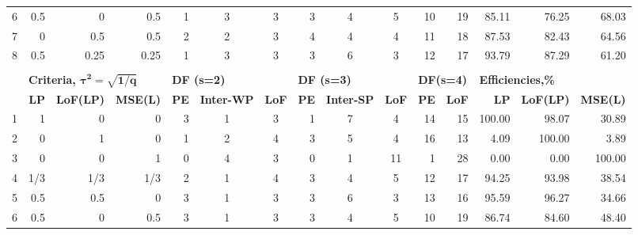 \begin{table}[h]
{\begin{tabular}{rrrrccccccrrrrr}
6 & 0.5  & 0    & 0.5  & \multicolumn{1}{|r}{1} & 3 & 3 & \multicolumn{1}{|r}{3} & 4 & 5  & \multicolumn{1}{|r}{10} & 19 & \multicolumn{1}{|r}{85.11}  & 76.25  & 68.03  \\
7 & 0    & 0.5  & 0.5  & \multicolumn{1}{|r}{2} & 2 & 3 & \multicolumn{1}{|r}{4} & 4 & 4  & \multicolumn{1}{|r}{11} & 18 & \multicolumn{1}{|r}{87.53}  & 82.43  & 64.56  \\
8 & 0.5  & 0.25 & 0.25 & \multicolumn{1}{|r}{1} & 3 & 3 & \multicolumn{1}{|r}{3} & 6 & 3  & \multicolumn{1}{|r}{12} & 17 & \multicolumn{1}{|r}{93.79}  & 87.29  & 61.20  \\
  &      &      &      &   &   &   &   &   &    &    &    &        &        &        \\
  & \multicolumn{3}{l}{\textbf{Criteria, $\bm{\tau^2=\sqrt{1/q}}$}}    & \multicolumn{3}{l}{\textbf{DF (s=2)}}   & \multicolumn{3}{l}{\textbf{DF (s=3)}}    & \multicolumn{2}{l}{\textbf{DF(s=4)}} & \multicolumn{3}{l}{\textbf{Efficiencies,\%}}     \\
  & \textbf{LP} & \textbf{LoF(LP)} & \textbf{MSE(L)} & \textbf{PE} & \textbf{Inter-WP} & \textbf{LoF} & \textbf{PE} & \textbf{Inter-SP} & \textbf{LoF}& \textbf{PE}      & \textbf{LoF}      & \textbf{LP} & \textbf{LoF(LP)} & \textbf{MSE(L)} \\   
1 & 1    & 0    & 0    & \multicolumn{1}{|r}{3} & 1 & 3 & \multicolumn{1}{|r}{1} & 7 & 4  & \multicolumn{1}{|r}{14} & 15 & \multicolumn{1}{|r}{100.00} & 98.07  & 30.89  \\
2 & 0    & 1    & 0    & \multicolumn{1}{|r}{1} & 2 & 4 & \multicolumn{1}{|r}{3} & 5 & 4  & \multicolumn{1}{|r}{16} & 13 & \multicolumn{1}{|r}{4.09}   & 100.00 & 3.89   \\
3 & 0    & 0    & 1    & \multicolumn{1}{|r}{0} & 4 & 3 & \multicolumn{1}{|r}{0} & 1 & 11 & \multicolumn{1}{|r}{1}  & 28 & \multicolumn{1}{|r}{0.00}   & 0.00   & 100.00 \\
4 & 1/3 & 1/3 & 1/3    & \multicolumn{1}{|r}{2} & 1 & 4 & \multicolumn{1}{|r}{3} & 4 & 5  & \multicolumn{1}{|r}{12} & 17 & \multicolumn{1}{|r}{94.25}  & 93.98  & 38.54  \\
5 & 0.5  & 0.5  & 0    & \multicolumn{1}{|r}{3} & 1 & 3 & \multicolumn{1}{|r}{3} & 6 & 3  & \multicolumn{1}{|r}{13} & 16 & \multicolumn{1}{|r}{95.59}  & 96.27  & 34.66  \\
6 & 0.5  & 0    & 0.5  & \multicolumn{1}{|r}{3} & 1 & 3 & \multicolumn{1}{|r}{3} & 4 & 5  & \multicolumn{1}{|r}{10} & 19 & \multicolumn{1}{|r}{86.74}  & 84.60  & 48.40  \\

\end{tabular}}
\end{table}
